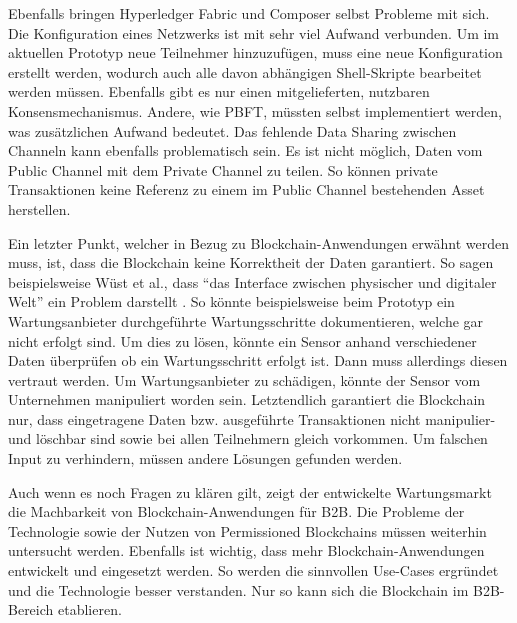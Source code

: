Ebenfalls bringen Hyperledger Fabric und Composer selbst Probleme mit sich. Die Konfiguration eines Netzwerks ist mit sehr viel Aufwand verbunden. Um im aktuellen Prototyp neue Teilnehmer hinzuzufügen, muss eine neue Konfiguration erstellt werden, wodurch auch alle davon abhängigen Shell-Skripte bearbeitet werden müssen. Ebenfalls gibt es nur einen mitgelieferten, nutzbaren Konsensmechanismus. Andere, wie PBFT, müssten selbst implementiert werden, was zusätzlichen Aufwand bedeutet. Das fehlende Data Sharing zwischen Channeln kann ebenfalls problematisch sein. Es ist nicht möglich, Daten vom Public Channel mit dem Private Channel zu teilen. So können private Transaktionen keine Referenz zu einem im Public Channel bestehenden Asset herstellen.

Ein letzter Punkt, welcher in Bezug zu Blockchain-Anwendungen erwähnt werden muss, ist, dass die Blockchain keine Korrektheit der Daten garantiert. So sagen beispielsweise Wüst et al., dass ``das Interface zwischen physischer und digitaler Welt'' ein Problem darstellt \cite{WustyouneedBlockchain2017}. So könnte beispielsweise beim Prototyp ein Wartungsanbieter durchgeführte Wartungsschritte dokumentieren, welche gar nicht erfolgt sind. Um dies zu lösen, könnte ein Sensor anhand verschiedener Daten überprüfen ob ein Wartungsschritt erfolgt ist. Dann muss allerdings diesen vertraut werden. Um Wartungsanbieter zu schädigen, könnte der Sensor vom Unternehmen manipuliert worden sein. Letztendlich garantiert die Blockchain nur, dass eingetragene Daten bzw. ausgeführte Transaktionen nicht manipulier- und löschbar sind sowie bei allen Teilnehmern gleich vorkommen. Um falschen Input zu verhindern, müssen andere Lösungen gefunden werden.

Auch wenn es noch Fragen zu klären gilt, zeigt der entwickelte Wartungsmarkt die Machbarkeit von Blockchain-Anwendungen für B2B. Die Probleme der Technologie sowie der Nutzen von Permissioned Blockchains müssen weiterhin untersucht werden. Ebenfalls ist wichtig, dass mehr Blockchain-Anwendungen entwickelt und eingesetzt werden. So werden die sinnvollen Use-Cases ergründet und die Technologie besser verstanden. Nur so kann sich die Blockchain im B2B-Bereich etablieren.



